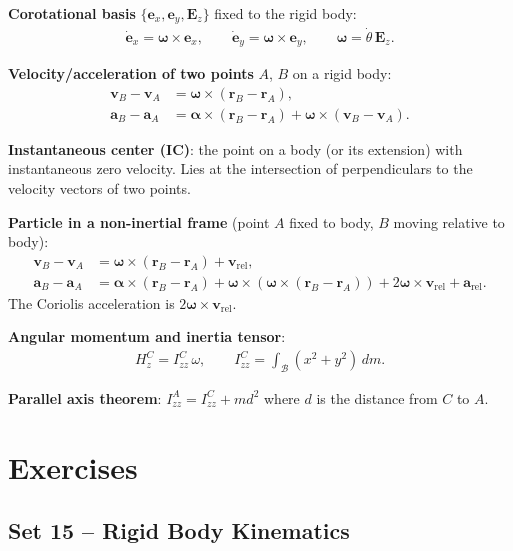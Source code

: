 \documentclass[
  letterpaper,
  DIV=11,
  numbers=noendperiod]{scrreprt}
\begin{document}
\textbf{Corotational basis}
\(\{\mathbf{e}_x,\mathbf{e}_y,\mathbf{E}_z\}\) fixed to the rigid body:
\begin{align}
    \dot{\mathbf{e}}_x = \boldsymbol{\omega}\times\mathbf{e}_x, \qquad
    \dot{\mathbf{e}}_y = \boldsymbol{\omega}\times\mathbf{e}_y, \qquad
    \boldsymbol{\omega}=\dot\theta\,\mathbf{E}_z.
\end{align}

\textbf{Velocity/acceleration of two points} \(A\), \(B\) on a rigid
body: \begin{align}
    \mathbf{v}_B - \mathbf{v}_A &= \boldsymbol{\omega}\times(\mathbf{r}_B-\mathbf{r}_A), \\
    \mathbf{a}_B - \mathbf{a}_A &= \boldsymbol{\alpha}\times(\mathbf{r}_B-\mathbf{r}_A)+\boldsymbol{\omega}\times(\mathbf{v}_B-\mathbf{v}_A).
\end{align}

\textbf{Instantaneous center (IC)}: the point on a body (or its
extension) with instantaneous zero velocity. Lies at the intersection of
perpendiculars to the velocity vectors of two points.

\textbf{Particle in a non-inertial frame} (point \(A\) fixed to body,
\(B\) moving relative to body): \begin{align}
    \mathbf{v}_B - \mathbf{v}_A &= \boldsymbol{\omega}\times(\mathbf{r}_B-\mathbf{r}_A)+\mathbf{v}_{\mathrm{rel}}, \\
    \mathbf{a}_B - \mathbf{a}_A &= \boldsymbol{\alpha}\times(\mathbf{r}_B-\mathbf{r}_A)+\boldsymbol{\omega}\times(\boldsymbol{\omega}\times(\mathbf{r}_B-\mathbf{r}_A))+2\boldsymbol{\omega}\times\mathbf{v}_{\mathrm{rel}}+\mathbf{a}_{\mathrm{rel}}.
\end{align} The Coriolis acceleration is
\(2\boldsymbol{\omega}\times\mathbf{v}_{\mathrm{rel}}\).

\textbf{Angular momentum and inertia tensor}: \begin{align}
    H^C_z = I^C_{zz}\,\omega, \qquad
    I^C_{zz} = \int_{\mathcal{B}}(x^2+y^2)\,dm.
\end{align}

\textbf{Parallel axis theorem}: \(I^A_{zz} = I^C_{zz} + m d^2\) where
\(d\) is the distance from \(C\) to \(A\).

\section{Exercises}\label{exercises-14}

\subsection{Set 15 -- Rigid Body
Kinematics}\label{set-15-rigid-body-kinematics}
\end{document}
